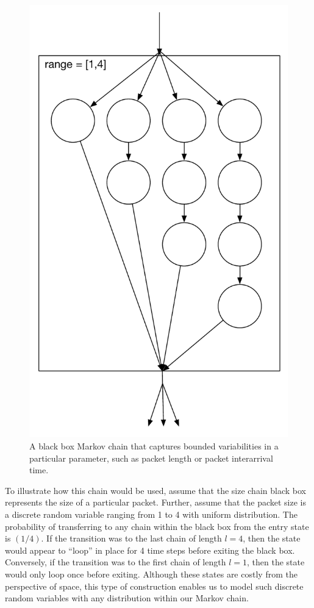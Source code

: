 \documentclass[conference]{IEEEtran}
\begin{document}
\begin{figure}
\begin{center}
\includegraphics[scale=0.3]{../../sketches/size_chain_old.pdf}
\caption{A black box Markov chain that captures bounded variabilities in a particular parameter, such as packet length or packet interarrival time.}
\label{fig:size_chain}
\end{center}
\end{figure}

To illustrate how this chain would be used, assume that the size chain black box represents the size of a particular packet. Further, assume that the packet size is a discrete random variable ranging from 1 to 4 with uniform distribution. The probability of transferring to any chain within the black box from the entry state is $(1/4)$. If the transition was to the last chain of length $l = 4$, then the state would appear to ``loop'' in place for 4 time steps before exiting the black box. Conversely, if the transition was to the first chain of length $l = 1$, then the state would only loop once before exiting. Although these states are costly from the perspective of space, this type of construction enables us to model such discrete random variables with any distribution within our Markov chain. 
\end{document}
